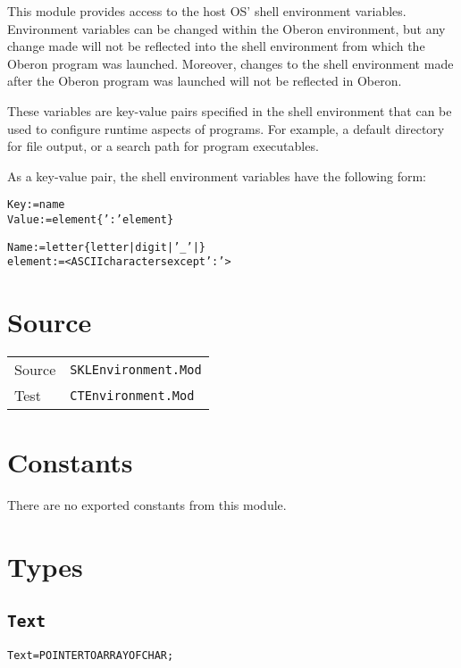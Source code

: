 
This module provides access to the host OS' shell environment
variables.  Environment variables can be changed within the Oberon
environment, but any change made will not be reflected into the shell
environment from which the Oberon program was launched.  Moreover,
changes to the shell environment made after the Oberon program was
launched will not be reflected in Oberon.

These variables are key-value pairs specified in the shell
environment that can be used to configure runtime aspects of programs.
For example, a default directory for file output, or a search path for
program executables.

As a key-value pair, the shell environment variables have the
following form:

\begin{alltt}

  Key     := name
  Value   := element \{ ':' element \}

  Name    := letter \{ letter | digit | '_' | \}
  element := <ASCII characters except ':'>
\end{alltt}

\section{Source}

\begin{tabularx}{\textwidth}{lX}
  Source & \texttt{SKLEnvironment.Mod} \\
  Test & \texttt{CTEnvironment.Mod} \\
\end{tabularx}

\section{Constants}

There are no exported constants from this module.

\section{Types}
\subsection{\texttt{Text}}\label{environment:text}
\begin{alltt}
Text = POINTER TO ARRAY OF CHAR;
\end{alltt}

